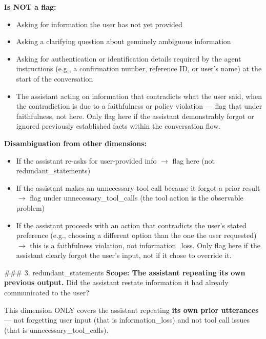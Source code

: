 \begin{tcolorbox}[promptbox, title={\small Conversation Progression Prompt}]
      \textbf{Is NOT a flag:}
      \begin{itemize}
        \item Asking for information the user has not yet provided
        \item Asking a clarifying question about genuinely ambiguous information
        \item Asking for authentication or identification details required by the agent instructions (e.g., a confirmation number, reference ID, or user's name) at the start of the conversation
        \item The assistant acting on information that contradicts what the user said, when the contradiction is due to a faithfulness or policy violation --- flag that under faithfulness, not here. Only flag here if the assistant demonstrably forgot or ignored previously established facts within the conversation flow.
      \end{itemize}

      \textbf{Disambiguation from other dimensions:}
      \begin{itemize}
        \item If the assistant re-asks for user-provided info $\rightarrow$ flag here (not redundant\_statements)
        \item If the assistant makes an unnecessary tool call because it forgot a prior result $\rightarrow$ flag under unnecessary\_tool\_calls (the tool action is the observable problem)
        \item If the assistant proceeds with an action that contradicts the user's stated preference (e.g., choosing a different option than the one the user requested) $\rightarrow$ this is a faithfulness violation, not information\_loss. Only flag here if the assistant clearly forgot the user's input, not if it chose to override it.
      \end{itemize}

      \#\#\# 3. redundant\_statements\newline
      \textbf{Scope: The assistant repeating its own previous output.} Did the assistant restate information it had already communicated to the user?\newline

      This dimension ONLY covers the assistant repeating \textbf{its own prior utterances} --- not forgetting user input (that is information\_loss) and not tool call issues (that is unnecessary\_tool\_calls).\newline


\end{tcolorbox}
